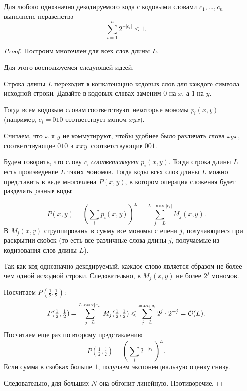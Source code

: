 \begin{thm}\label{thm:km}
    Для любого однозначно декодируемого кода с кодовыми словами $  c_1, \ldots , c_n$ выполнено неравенство
	\[
	\sum_{i=1}^{n} 2^{-\lvert c_i \rvert } \le 1
	.\] 
\end{thm}
\begin{proof}
	Построим многочлен для всех слов длины $ L$. 

	Для этого воспользуемся следующей идеей.

	Строка длины $L$ переходит в конкатенацию кодовых слов для каждого символа исходной строки.
	Давайте в кодовых словах заменим $0$ на $x$, а $1$ на $y$. 

	Тогда всем кодовым словам соответствуют некоторые мономы $ p_i(x, y)$ (например, $c_i = 010$ соответствует моном $xyx$).

	Считаем, что $x$ и $y$ не коммутируют, чтобы удобнее было различать слова $xyx$, соответствующие $010$ и $xxy$, соответствующие $001$. 

	Будем говорить, что слову \textit{$c_i$ соответствует $p_i(x,y)$}. 
	Тогда строка длины $L$ есть произведение $L$ таких мономов. Тогда коды всех слов длины $L$ можно представить в виде многочлена $P(x, y)$, в котором операция сложения будет разделять разные коды:

	\[
		P(x, y) = \left( \sum_{i}^{} p_i(x, y) \right) ^{L} = \sum_{j=L}^{L\cdot\max \lvert c_i\rvert} M_j(x, y)
	.\] 
	В $M_j(x, y)$ сгруппированы в сумму все мономы степени $j$, получающиеся при раскрытии скобок (то есть все различные слова длины $j$, получаемые из кодирования слов длины $L$).

	Так как код однозначно декодируемый, каждое слово является образом не более чем одной исходной строки. Следовательно, в $M_j(x, y)$ не более $2^j$ мономов.

	Посчитаем $ P(\frac{1}{2}, \frac{1}{2})$:
	\[
		P(\tfrac{1}{2},\tfrac{1}{2}) = \sum_{j=L}^{L\cdot\max \lvert c_i\rvert} M_{j}(\tfrac{1}{2},\tfrac{1}{2}) \leqslant \sum_{j=L}^{\max_{i} c_i}2^{j} \cdot 2 ^{-j} = \mathcal{O}(L)
	.\] 
	Посчитаем еще раз по второму представлению
	\[
		P(\tfrac{1}{2},\tfrac{1}{2}) = \left( \sum_{i} 2^{-\lvert c_i \rvert } \right) ^{L}
	.\] 
	Если сумма в скобках больше $ 1$, получаем экспоненциальную оценку снизу.

	Следовательно, для больших $ N$ она обгонит линейную. Противоречие.
\end{proof}

